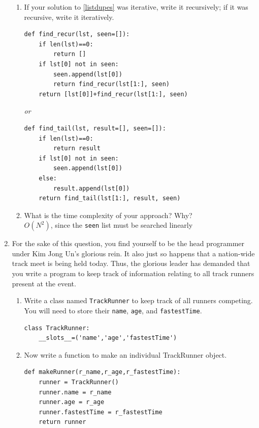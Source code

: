 \documentclass[11pt]{article}
\newenvironment{answer}{\large\lstset{basicstyle=\large}\color{white}}{}
\newenvironment{answer}{\large\lstset{basicstyle=\large}\color{red}}{}
\begin{document}
\begin{enumerate}
\begin{enumerate}
\item
If your solution to \ref{listdupes} was iterative, write it recursively; if it was recursive, write it iteratively.
\begin{answer}
\begin{lstlisting}
def find_recur(lst, seen=[]):
	if len(lst)==0:
		return []
	if lst[0] not in seen:
		seen.append(lst[0])
		return find_recur(lst[1:], seen)
	return [lst[0]]+find_recur(lst[1:], seen)
\end{lstlisting}
\textit{or}
\begin{lstlisting}
def find_tail(lst, result=[], seen=[]):
	if len(lst)==0:
		return result
	if lst[0] not in seen:
		seen.append(lst[0])
	else:
		result.append(lst[0])
	return find_tail(lst[1:], result, seen)
\end{lstlisting}
\end{answer}

\item
What is the time complexity of your approach?
Why? \\

\begin{answer}
$O(N^2)$, since the \texttt{seen} list must be searched linearly
\end{answer}
\end{enumerate}

\newpage
\item For the sake of this question, you find yourself to be the head programmer under Kim Jong Un's glorious rein.
It also just so happens that a nation-wide track meet is being held today. Thus, the glorious leader has demanded that
you write a program to keep track of information relating to all track runners present at the event.

\begin{enumerate}
\item Write a class named \texttt{TrackRunner} to keep track of all runners competing.
You will need to store their \texttt{name}, \texttt{age}, and \texttt{fastestTime}.
\begin{answer}
\begin{lstlisting}
class TrackRunner:
    __slots__=('name','age','fastestTime')

\end{lstlisting}
\end{answer}

\item Now write a function to make an individual TrackRunner object.
\begin{answer}
\begin{lstlisting}
def makeRunner(r_name,r_age,r_fastestTime):
    runner = TrackRunner()
    runner.name = r_name
    runner.age = r_age
    runner.fastestTime = r_fastestTime
    return runner
\end{lstlisting}
\end{answer}


\end{enumerate}
\end{enumerate}
\end{document}
